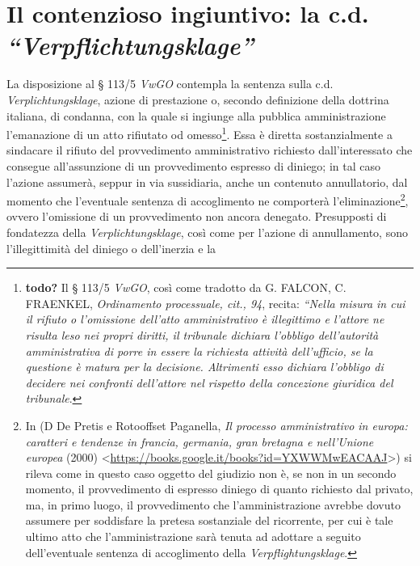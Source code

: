 \documentclass[12pt,it,a4paper,]{report}
\begin{document}
\hypertarget{il-contenzioso-ingiuntivo-la-c.d.-verpflichtungsklage}{%
\section{\texorpdfstring{Il contenzioso ingiuntivo: la c.d.
\emph{``Verpflichtungsklage''}}{Il contenzioso ingiuntivo: la c.d. ``Verpflichtungsklage''}}\label{il-contenzioso-ingiuntivo-la-c.d.-verpflichtungsklage}}

La disposizione al § 113/5 \emph{VwGO} contempla la sentenza sulla c.d.
\emph{Verplichtungsklage}, azione di prestazione o, secondo definizione
della dottrina italiana, di condanna, con la quale si ingiunge alla
pubblica amministrazione l'emanazione di un atto rifiutato od
omesso\footnote{\textbf{todo?} Il § 113/5 \emph{VwGO}, così come
  tradotto da G. FALCON, C. FRAENKEL, \emph{Ordinamento processuale,
  cit., 94}, recita: \emph{``Nella misura in cui il rifiuto o
  l'omissione dell'atto amministrativo è illegittimo e l'attore ne
  risulta leso nei propri diritti, il tribunale dichiara l'obbligo
  dell'autorità amministrativa di porre in essere la richiesta attività
  dell'ufficio, se la questione è matura per la decisione. Altrimenti
  esso dichiara l'obbligo di decidere nei confronti dell'attore nel
  rispetto della concezione giuridica del tribunale}.}. Essa è diretta
sostanzialmente a sindacare il rifiuto del provvedimento amministrativo
richiesto dall'interessato che consegue all'assunzione di un
provvedimento espresso di diniego; in tal caso l'azione assumerà, seppur
in via sussidiaria, anche un contenuto annullatorio, dal momento che
l'eventuale sentenza di accoglimento ne comporterà
l'eliminazione\footnote{In (D De Pretis e Rotooffset Paganella, \emph{Il
  processo amministrativo in europa: caratteri e tendenze in francia,
  germania, gran bretagna e nell'Unione europea} (2000)
  \textless{}\url{https://books.google.it/books?id=YXWWMwEACAAJ}\textgreater{})
  si rileva come in questo caso oggetto del giudizio non è, se non in un
  secondo momento, il provvedimento di espresso diniego di quanto
  richiesto dal privato, ma, in primo luogo, il provvedimento che
  l'amministrazione avrebbe dovuto assumere per soddisfare la pretesa
  sostanziale del ricorrente, per cui è tale ultimo atto che
  l'amministrazione sarà tenuta ad adottare a seguito dell'eventuale
  sentenza di accoglimento della \emph{Verpflightungsklage}.}, ovvero
l'omissione di un provvedimento non ancora denegato. Presupposti di
fondatezza della \emph{Verplichtungsklage}, così come per l'azione di
annullamento, sono l'illegittimità del diniego o dell'inerzia e la
\end{document}
